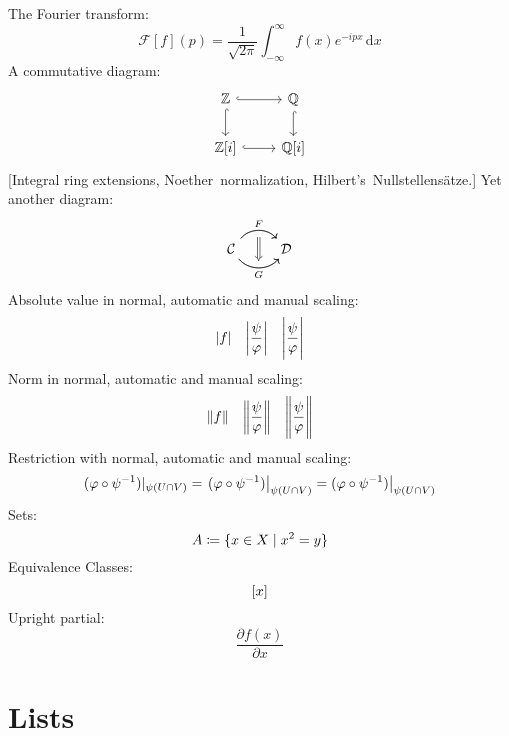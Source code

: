 The Fourier transform:
\[
	\mathcal{F}[f](p)
	=
	\frac{1}{\sqrt{2\pi}}
	\int_{-\infty}^\infty
	f(x) e^{-ipx}
	\,\mathrm{d}x
\]
A commutative diagram:
\[
	\begin{tikzcd}
		\Integer
		\arrow[hookrightarrow]{r}
		\arrow[hookrightarrow]{d}
		&
		\Rational
		\arrow[hookrightarrow]{d}
		\\
		\Integer[i]
		\arrow[hookrightarrow]{r}
		&
		\Rational[i]
	\end{tikzcd}
\]
[Integral ring extensions, Noether~normalization, Hilbert’s~Nullstellensätze.]
Yet another diagram:
\[
	\begin{tikzcd}
		\mathcal{C}
		\arrow[bend left = 50]{r}[above]{F}
		\arrow[bend right = 50]{r}[below]{G}
		\arrow[bend left = 50]{r}[below, name = U]{}
		\arrow[bend right = 50]{r}[above, name = D]{}
		&
		\mathcal{D}
		\arrow[Rightarrow, from = U, to = D]{l}
	\end{tikzcd}
\]
Absolute value in normal, automatic and manual scaling:
\[
	\abs{f}
	\quad
	\abs*{\frac{\psi}{\varphi}}
	\quad
	\abs[\Bigg]{\frac{\psi}{\varphi}}
\]
Norm in normal, automatic and manual scaling:
\[
	\norm{f}
	\quad
	\norm*{\frac{\psi}{\varphi}}
	\quad
	\norm[\Bigg]{\frac{\psi}{\varphi}}
\]
Restriction with normal, automatic and manual scaling:
\[
	\restrict{(\varphi \circ \psi^{-1})}{\psi(U \cap V)}
	=
	\restrict*{(\varphi \circ \psi^{-1})}{\psi(U \cap V)}
	=
	\restrict[\big]{(\varphi \circ \psi^{-1})}{\psi(U \cap V)}
\]
Sets:
\[
	A
	\defined
	\{ x \in X \suchthat x^2 = y \}
\]
Equivalence Classes:
\[
	\lbrack x\rbrack
\]
Upright partial:
\[
	\frac{\partial f(x)}{\partial x}
\]





\section{Lists}

